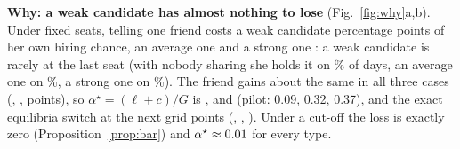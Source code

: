\documentclass[conference]{IEEEtran}
\theoremstyle{plain}
\theoremstyle{definition}\newtheorem{definition}{Definition}
\newcommand{\finding}[1]{\textbf{#1}}
\begin{document}
\finding{Why: a weak candidate has almost nothing to lose} (Fig.~\ref{fig:why}a,b). Under fixed seats, telling one friend costs a weak candidate \EllSeatsWeak{} percentage points of her own
hiring chance, an average one \EllSeatsAvg{} and a strong one \EllSeatsStrong{}: a weak candidate is rarely at the last seat (with nobody sharing she holds it on \PivWeak\% of days, an average one on \PivAvg\%, a strong one on \PivStrong\%).
The friend gains about the same in all three cases (\GainSeatsWeak, \GainSeatsAvg, \GainSeatsStrong{} points), so $\alpha^\star=(\ell+c)/G$ is \AstarLocalSeatsWeak, \AstarLocalSeatsAvg{} and \AstarLocalSeatsStrong{}
(pilot: 0.09, 0.32, 0.37), and the exact equilibria switch at the next grid points (\AstarGridSeatsWeak, \AstarGridSeatsAvg, \AstarGridSeatsStrong). Under a cut-off the loss is exactly zero (Proposition~\ref{prop:bar}) and $\alpha^\star\approx0.01$ for every type.
\end{document}
